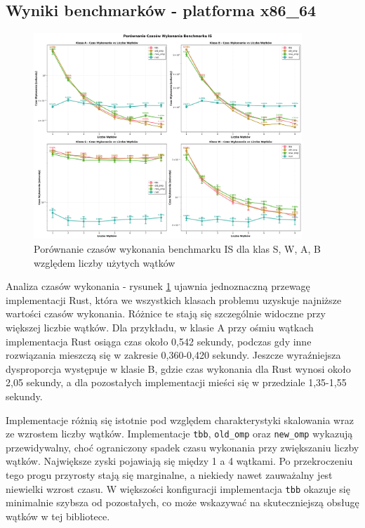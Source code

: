 \subsection{Wyniki benchmarków - platforma x86\_64}
\begin{figure}[H]
    \centering
    \includegraphics[width=0.9\textwidth]{analiza/images/parallel/is/x86/is_porownanie_czasow_wykonania.png}
    \caption{Porównanie czasów wykonania benchmarku IS dla klas S, W, A, B względem liczby użytych wątków}
    \label{is_porownanie_czasow_wykonania_x86}
\end{figure}
Analiza czasów wykonania - rysunek \ref{is_porownanie_czasow_wykonania_x86} ujawnia jednoznaczną przewagę implementacji Rust, która we wszystkich klasach problemu uzyskuje najniższe wartości czasów wykonania. Różnice te stają się szczególnie widoczne przy większej liczbie wątków. Dla przykładu, w klasie A przy ośmiu wątkach implementacja Rust osiąga czas około 0,542 sekundy, podczas gdy inne rozwiązania mieszczą się w zakresie 0,360-0,420 sekundy. Jeszcze wyraźniejsza dysproporcja występuje w klasie B, gdzie czas wykonania dla Rust wynosi około 2,05 sekundy, a dla pozostałych implementacji mieści się w przedziale 1,35-1,55 sekundy.

Implementacje różnią się istotnie pod względem charakterystyki skalowania wraz ze wzrostem liczby wątków. Implementacje \texttt{tbb}, \texttt{old\_omp} oraz \texttt{new\_omp} wykazują przewidywalny, choć ograniczony spadek czasu wykonania przy zwiększaniu liczby wątków. Największe zyski pojawiają się między 1 a 4 wątkami. Po przekroczeniu tego progu przyrosty stają się marginalne, a niekiedy nawet zauważalny jest niewielki wzrost czasu. W większości konfiguracji implementacja \texttt{tbb} okazuje się minimalnie szybsza od pozostałych, co może wskazywać na skuteczniejszą obsługę wątków w tej bibliotece.

